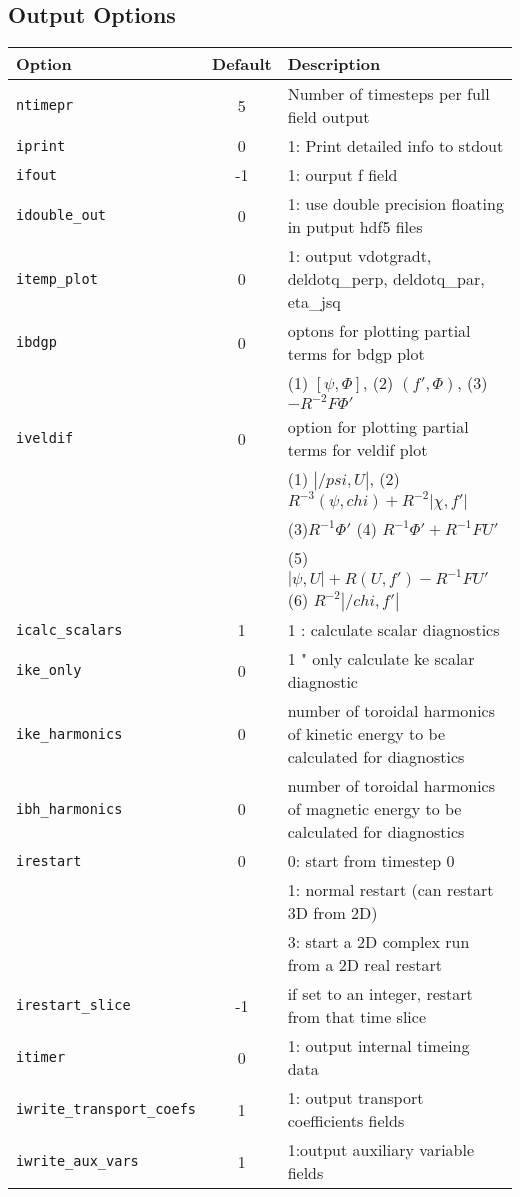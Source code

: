 \subsection{Output Options}

\begin{tabular}{lcp{4in}}
  \textbf{Option}&\textbf{Default}&\textbf{Description}\\
  \hline
  \texttt{ntimepr}   & 5 & Number of timesteps per full field output\\
  \texttt{iprint}    & 0 & 1: Print detailed info to stdout\\
 \texttt{ifout}      & -1 & 1: ourput f field \\
 \texttt{idouble\_out} & 0 & 1: use double precision floating in putput hdf5 files \\
 \texttt{itemp\_plot}  & 0 & 1: output vdotgradt, deldotq\_perp, deldotq\_par, eta\_jsq \\
 \texttt{ibdgp}        & 0 & optons for plotting partial terms for bdgp plot \\
                       &   & (1) $[ \psi, \Phi] $, (2) $(f\prime,\Phi) $, (3) $-R^{-2} F \Phi \prime$ \\
 \texttt{iveldif}      & 0 & option for plotting partial terms for veldif plot \\
                       &   & (1) $|/psi,U|$, (2) $R^{-3}(\psi,chi) + R^{-2}|\chi,f\prime|$ \\
                       &   & (3)$ R^{-1} \Phi \prime$   (4) $R^{-1} \Phi \prime + R^{-1} F U\prime $ \\
                       &   & (5) $|\psi,U| + R(U,f\prime) - R^{-1}F U\prime $ (6) $R^{-2} |/chi,f\prime| $ \\
 \texttt{icalc\_scalars} & 1 & 1 : calculate scalar diagnostics \\
 \texttt{ike\_only}      & 0 & 1 " only calculate ke scalar diagnostic \\
 \texttt{ike\_harmonics} & 0 & number of toroidal harmonics of kinetic energy to be calculated for diagnostics \\
 \texttt{ibh\_harmonics} & 0 & number of toroidal harmonics of magnetic energy to be calculated for diagnostics \\
 \texttt{irestart}       & 0 & 0: start from timestep 0 \\
                         &   & 1: normal restart (can restart 3D from 2D) \\
                         &   & 3: start a 2D complex run from a 2D real restart \\
 \texttt{irestart\_slice}  & -1 & if set to an integer, restart from that time slice \\
 \texttt{itimer}           & 0 & 1: output internal timeing data \\
 \texttt{iwrite\_transport\_coefs}  & 1 & 1: output transport coefficients fields \\
 \texttt{iwrite\_aux\_vars}         & 1 & 1:output auxiliary variable fields \\

\end{tabular}


